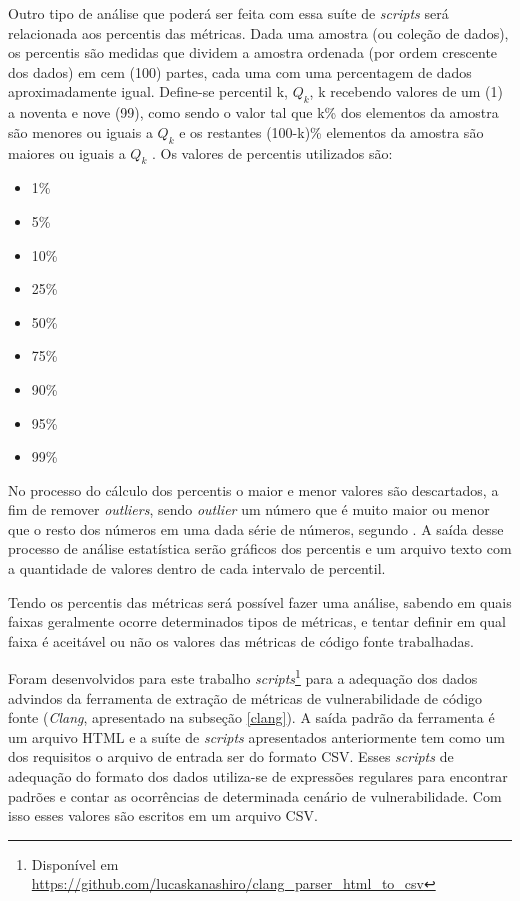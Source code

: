 Outro tipo de análise que poderá ser feita com essa suíte de \textit{scripts} será relacionada aos percentis das métricas.
Dada uma amostra (ou coleção de dados), os percentis são medidas que dividem a amostra ordenada (por ordem crescente dos dados) 
em cem (100) partes, cada uma com uma percentagem de dados aproximadamente igual. Define-se percentil k, ${Q_k}$, 
k recebendo valores de um (1) a noventa e nove (99), como sendo o valor tal que k\% dos elementos da amostra são menores ou 
iguais a ${Q_k}$ e os restantes (100-k)\% elementos da amostra são maiores ou iguais a ${Q_k}$ \cite{martins2013}. Os valores
de percentis utilizados são: 

\begin{multicols}{3}
  \begin{itemize}
    \item 1\%
    \item 5\%
    \item 10\%
    \item 25\%
    \item 50\%
    \item 75\%
    \item 90\%
    \item 95\%
    \item 99\%
  \end{itemize}
\end{multicols}

No processo do cálculo dos percentis o maior e menor valores são descartados, a
fim de remover \textit{outliers}, sendo \textit{outlier} um número que é muito maior 
ou menor que o resto dos números em uma dada série de números, segundo
. A saída desse processo de análise estatística serão gráficos 
dos percentis e um arquivo texto com a quantidade de valores dentro de cada intervalo 
de percentil.

Tendo os percentis das métricas será possível fazer uma análise, sabendo em quais faixas geralmente ocorre 
determinados tipos de métricas, e tentar definir em qual faixa é aceitável ou não os valores das métricas de 
código fonte trabalhadas.

Foram desenvolvidos para este trabalho \textit{scripts}\footnote{Disponível em
\url{https://github.com/lucaskanashiro/clang\_parser\_html\_to\_csv}} para a adequação dos
dados advindos da ferramenta de extração de métricas de vulnerabilidade de
código fonte (\emph{Clang}, apresentado na subseção \ref{clang}). A saída padrão
da ferramenta é um arquivo HTML e a suíte de \textit{scripts} apresentados
anteriormente tem como um dos requisitos o arquivo de entrada ser do formato
CSV. Esses \textit{scripts} de adequação do formato dos dados utiliza-se de
expressões regulares para encontrar padrões e contar as ocorrências de
determinada cenário de vulnerabilidade. Com isso esses valores são escritos em
um arquivo CSV.

